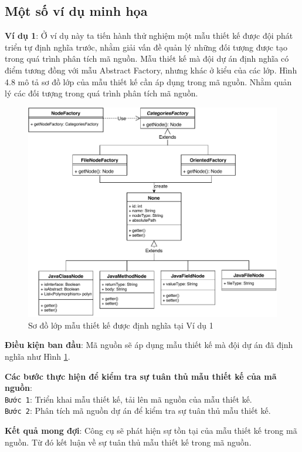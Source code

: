 \documentclass[12pt]{report}
\begin{document}
\subsection{Một số ví dụ minh họa}
\noindent \textbf{Ví dụ 1}: Ở ví dụ này ta tiến hành thử nghiệm một mẫu thiết kế được đội phát triển tự định nghĩa trước, nhằm giải vấn đề quản lý những đối tượng được tạo trong quá trình phân tích mã nguồn. Mẫu thiết kế mà đội dự án định nghĩa có điểm tương đồng với mẫu Abstract Factory, nhưng khác ở kiểu của các lớp. Hình 4.8  mô tả sơ đồ lớp của mẫu thiết kế cần áp dụng trong mã nguồn. Nhằm quản lý các đối tượng trong quá trình phân tích mã nguồn.\\
\begin{figure}[h]
	\centering
	\includegraphics[scale=0.7]{images/node_factory.pdf}
	\caption{Sơ đồ lớp mẫu thiết kế được định nghĩa tại Ví dụ 1}
	\label{fig:node_factory}
\end{figure}

\noindent \textbf{Điều kiện ban đầu}: Mã nguồn sẽ áp dụng mẫu thiết kế mà đội dự án đã định nghĩa như Hình \ref{fig:node_factory}.

\noindent \textbf{Các bước thực hiện để kiểm tra sự tuân thủ mẫu thiết kế của mã nguồn}:\\
\texttt{Bước 1}: Triển khai mẫu thiết kế, tải lên mã nguồn của mẫu thiết kế.\\
\texttt{Bước 2}: Phân tích mã nguồn dự án để kiểm tra sự tuân thủ mẫu thiết kế.

\noindent \textbf{Kết quả mong đợi}: Công cụ sẽ phát hiện sự tồn tại của mẫu thiết kế trong mã nguồn. Từ đó kết luận về sự tuân thủ mẫu thiết kế trong mã nguồn.
\end{document}
